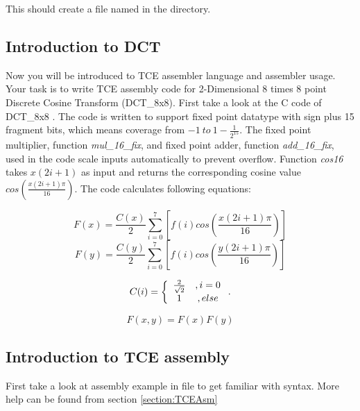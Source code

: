 \documentclass[twoside]{tceusermanual}
\begin{document}
This should create a file named  in the directory.

\subsection{Introduction to DCT}

Now you will be introduced to TCE assembler language and assembler usage.
Your task is to write TCE assembly code for 2-Dimensional 8 times 8 point 
Discrete Cosine Transform (DCT\_8x8).
First take a look at the C code of DCT\_8x8
.  
The code is written to support fixed point datatype with sign plus 15 fragment
bits, which means coverage from $-1\ to\ 1-\frac{1}{2^{15}}$. The fixed point
multiplier, function \textit{mul\_16\_fix}, and fixed point adder, function
\textit{add\_16\_fix},  used in the code scale inputs automatically to prevent
overflow. Function \textit{cos16} takes $x(2i+1)$ as input and returns
the corresponding cosine value $cos\left(\frac{x(2i+1)\pi}{16}\right)$. The code calculates
following equations:

\begin{equation}
F(x) = \frac{C(x)}{2}\sum_{i = 0}^7 \left[f(i)cos\left(\frac{x
\left(2i+1\right)\pi}{16}\right)\right] \nonumber
\end{equation}
\begin{equation}
F(y) = \frac{C(y)}{2}\sum_{i = 0}^7 \left[f(i)cos\left(\frac{y
\left(2i+1\right)\pi}{16}\right)\right] \nonumber
\end{equation}

\begin{equation}
C(i) = 
\left\{
\begin{array}{c c}
\frac{2}{\sqrt2} &,  i = 0 \\
1 &,  else 
\end{array} \right . . \nonumber
\end{equation}

\begin{equation}
F(x,y) = F(x)F(y) \nonumber
\end{equation}

\subsection{Introduction to TCE assembly}

First take a look at assembly example in file 
to get familiar with syntax. More help can be found from
section \ref{section:TCEAsm}
\end{document}
